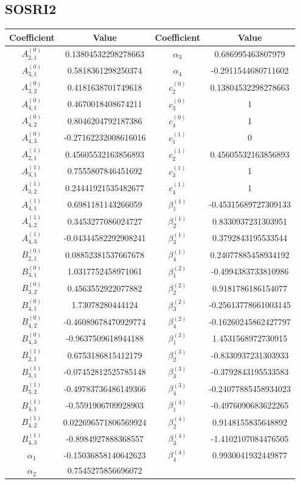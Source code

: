 \documentclass{article}
\begin{document}
\subsection{SOSRI2 \label{subsec:SOSRI2}}
\begin{center}
	\begin{tabular}{|c|c||c|c|}
		\hline
		Coefficient & Value & Coefficient & Value\tabularnewline
		\hline
		\hline
		$A_{2,1}^{(0)}$ & 0.13804532298278663 & $\alpha_{3}$ & 0.686995463807979\tabularnewline
		\hline
		$A_{3,1}^{(0)}$ & 0.5818361298250374 & $\alpha_{4}$ & -0.2911544680711602\tabularnewline
		\hline
		$A_{3,2}^{(0)}$ & 0.4181638701749618 & $c_{2}^{(0)}$ & 0.13804532298278663\tabularnewline
		\hline
		$A_{4,1}^{(0)}$ & 0.4670018408674211 & $c_{3}^{(0)}$ & 1\tabularnewline
		\hline
		$A_{4,2}^{(0)}$ & 0.8046204792187386 & $c_{4}^{(0)}$ & 1\tabularnewline
		\hline
		$A_{4,3}^{(0)}$ & -0.27162232008616016 & $c_{1}^{(1)}$ & 0\tabularnewline
		\hline
		$A_{2,1}^{(1)}$ & 0.45605532163856893 & $c_{2}^{(1)}$ & 0.45605532163856893\tabularnewline
		\hline
		$A_{3,1}^{(1)}$ & 0.7555807846451692 & $c_{3}^{(1)}$ & 1\tabularnewline
		\hline
		$A_{3,2}^{(1)}$ & 0.24441921535482677 & $c_{4}^{(1)}$ & 1\tabularnewline
		\hline
		$A_{4,1}^{(1)}$ & 0.6981181143266059 & $\beta_{1}^{(1)}$ & -0.45315689727309133\tabularnewline
		\hline
		$A_{4,2}^{(1)}$ & 0.3453277086024727 & $\beta_{2}^{(1)}$ & 0.8330937231303951\tabularnewline
		\hline
		$A_{4,3}^{(1)}$ & -0.04344582292908241 & $\beta_{3}^{(1)}$ & 0.3792843195533544\tabularnewline
		\hline
		$B_{2,1}^{(0)}$ & 0.08852381537667678 & $\beta_{4}^{(1)}$ & 0.24077885458934192\tabularnewline
		\hline
		$B_{3,1}^{(0)}$ & 1.0317752458971061 & $\beta_{1}^{(2)}$ & -0.4994383733810986\tabularnewline
		\hline
		$B_{3,2}^{(0)}$ & 0.4563552922077882 & $\beta_{2}^{(2)}$ & 0.9181786186154077\tabularnewline
		\hline
		$B_{4,1}^{(0)}$ & 1.73078280444124 & $\beta_{3}^{(2)}$ & -0.25613778661003145\tabularnewline
		\hline
		$B_{4,2}^{(0)}$ & -0.46089678470929774 & $\beta_{4}^{(2)}$ & -0.16260245862427797\tabularnewline
		\hline
		$B_{4,3}^{(0)}$ & -0.9637509618944188 & $\beta_{1}^{(3)}$ & 1.4531568972730915\tabularnewline
		\hline
		$B_{2,1}^{(1)}$ & 0.6753186815412179 & $\beta_{2}^{(3)}$ & -0.8330937231303933\tabularnewline
		\hline
		$B_{3,1}^{(1)}$ & -0.07452812525785148 & $\beta_{3}^{(3)}$ & -0.3792843195533583\tabularnewline
		\hline
		$B_{3,2}^{(1)}$ & -0.49783736486149366 & $\beta_{4}^{(3)}$ & -0.24077885458934023\tabularnewline
		\hline
		$B_{4,1}^{(1)}$ & -0.5591906709928903 & $\beta_{1}^{(4)}$ & -0.4976090683622265\tabularnewline
		\hline
		$B_{4,2}^{(1)}$ & 0.022696571806569924 & $\beta_{2}^{(4)}$ & 0.9148155835648892\tabularnewline
		\hline
		$B_{4,3}^{(1)}$ & -0.8984927888368557 & $\beta_{3}^{(4)}$ & -1.4102107084476505\tabularnewline
		\hline
		$\alpha_{1}$ & -0.15036858140642623 & $\beta_{4}^{(4)}$ & 0.9930041932449877\tabularnewline
		\hline
		$\alpha_{2}$ & 0.7545275856696072 &  & \tabularnewline
		\hline
	\end{tabular}
	\par\end{center}
\end{document}
